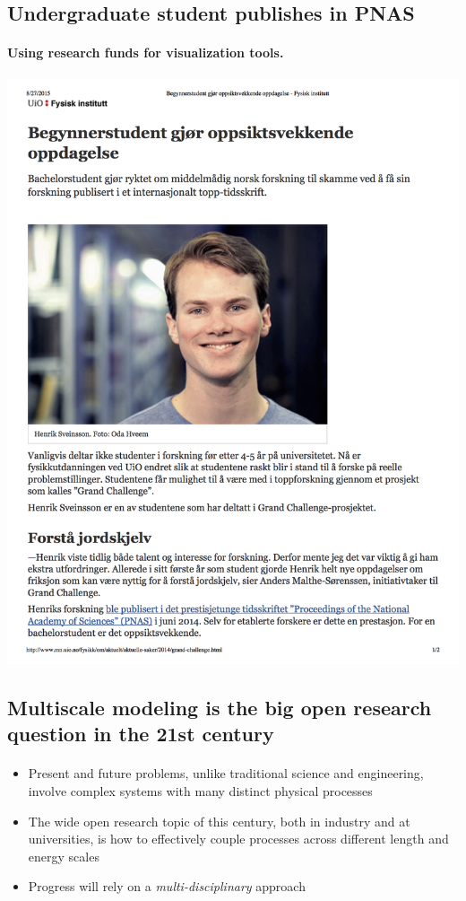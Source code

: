 \documentclass[%
oneside,                 %
final,                   %
10pt]{article}
\begin{document}
\subsection{Undergraduate student publishes in PNAS}

\paragraph{Using research funds for visualization tools.}


\centerline{\includegraphics[width=0.7\linewidth]{fig-future/pnas.png}}






\subsection{Multiscale modeling is the big open research question in the 21st century}


\paragraph{}
\begin{itemize}
\item Present and future problems, unlike traditional
  science and engineering, involve complex systems with many distinct
  physical processes

\item The wide open research topic of this century, both in industry and at universities, is how to effectively couple processes across different length and energy scales

\item Progress will rely on a \emph{multi-disciplinary} approach
\end{itemize}
\end{document}
